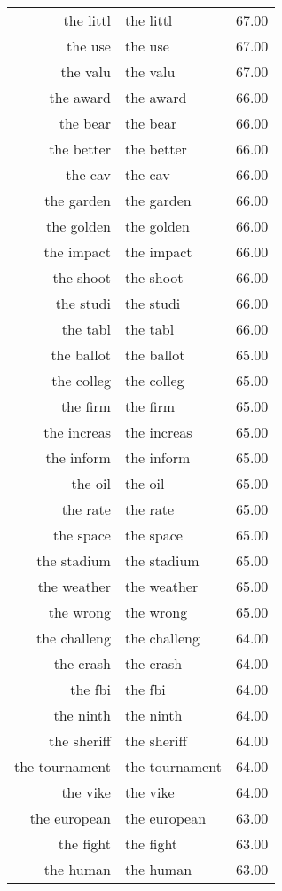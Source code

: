 \begin{table}[ht]
\begin{tabular}{rlr}
  the littl & the littl & 67.00 \\ 
  the use & the use & 67.00 \\ 
  the valu & the valu & 67.00 \\ 
  the award & the award & 66.00 \\ 
  the bear & the bear & 66.00 \\ 
  the better & the better & 66.00 \\ 
  the cav & the cav & 66.00 \\ 
  the garden & the garden & 66.00 \\ 
  the golden & the golden & 66.00 \\ 
  the impact & the impact & 66.00 \\ 
  the shoot & the shoot & 66.00 \\ 
  the studi & the studi & 66.00 \\ 
  the tabl & the tabl & 66.00 \\ 
  the ballot & the ballot & 65.00 \\ 
  the colleg & the colleg & 65.00 \\ 
  the firm & the firm & 65.00 \\ 
  the increas & the increas & 65.00 \\ 
  the inform & the inform & 65.00 \\ 
  the oil & the oil & 65.00 \\ 
  the rate & the rate & 65.00 \\ 
  the space & the space & 65.00 \\ 
  the stadium & the stadium & 65.00 \\ 
  the weather & the weather & 65.00 \\ 
  the wrong & the wrong & 65.00 \\ 
  the challeng & the challeng & 64.00 \\ 
  the crash & the crash & 64.00 \\ 
  the fbi & the fbi & 64.00 \\ 
  the ninth & the ninth & 64.00 \\ 
  the sheriff & the sheriff & 64.00 \\ 
  the tournament & the tournament & 64.00 \\ 
  the vike & the vike & 64.00 \\ 
  the european & the european & 63.00 \\ 
  the fight & the fight & 63.00 \\ 
  the human & the human & 63.00 \\ 

\end{tabular}
\end{table}

